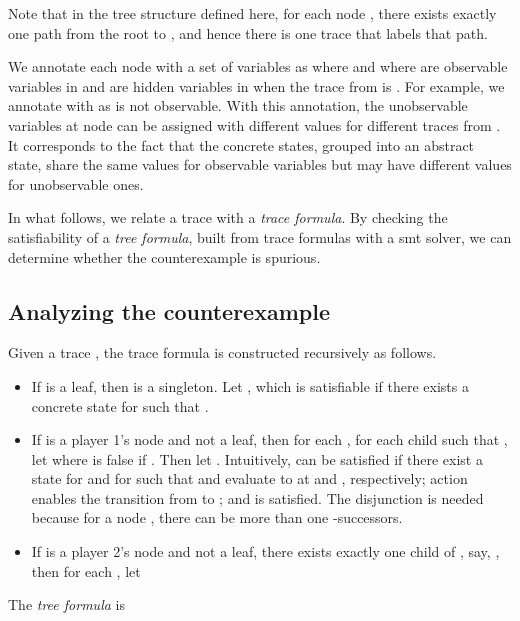 \documentclass[letterpaper, 10 pt, conference]{ieeeconf}
\begin{document}
Note that in the tree structure defined here, for each node , there exists exactly one path from the root to , and hence
there is one trace  that labels that path.











We annotate each node  with a set of variables 
as  where  and  where  are observable
variables in  and  are hidden variables in  when
the trace from  is .  For example, we annotate  with
 as
 is not observable.  With this annotation, the unobservable
variables  at node  can be assigned with different values for
different traces from . It corresponds to the fact that the
concrete states, grouped into an abstract state, share the same values
for observable variables but may have different values for
unobservable ones.


In what follows, we relate a trace with a \emph{trace formula}. By
checking the satisfiability of a \emph{tree formula}, built from trace
formulas with a \ac{smt} solver, we can determine whether the
counterexample is spurious.

\subsection{Analyzing the counterexample}
Given a trace , the trace formula  is
constructed recursively as follows. 

\begin{itemize}
\item If  is a leaf, then  is a singleton. Let , which is satisfiable if there exists
  a concrete state  for  such that
  .
  
\item If  is a player 1's node and not a leaf,
  then for each , for each child
   such that , let  
\vspace{-1ex}
   where  is false if . Then let . Intuitively,  can be satisfied if
  there exist a state  for  and  for  such
  that  and  evaluate to  at  and ,
  respectively; action  enables the transition from  to
  ; and  is satisfied. The disjunction is needed because
  for a node , there can be more than one -successors.
 
\item If  is a player 2's node and not a leaf, there
  exists exactly one child of , say, ,
then for each , let 
\end{itemize}
The \emph{tree formula} is 
\vspace{-1ex}
 
\end{document}
